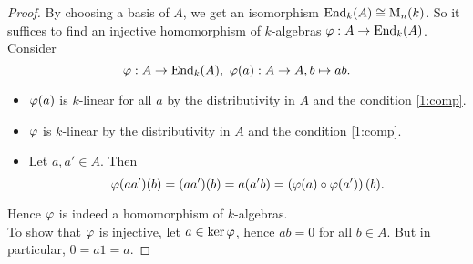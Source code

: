 \begin{proof}
	By choosing a basis of $A$, we get an isomorphism $\operatorname{End}_k(A)\cong \operatorname{M}_n(k)$. So it suffices to find an injective homomorphism of $k$-algebras $\varphi:A\to \operatorname{End}_k(A)$.\\
	Consider
	\[
	\varphi:A\to \operatorname{End}_k(A),~\varphi(a):A\to A,b\mapsto ab.
	\]
	\begin{itemize}
		\item $\varphi(a)$ is $k$-linear for all $a$ by the distributivity in $A$ and the condition \eqref{1:comp}.
		\item $\varphi$ is $k$-linear by the distributivity in $A$ and the condition \eqref{1:comp}.
		\item Let $a,a'\in A$. Then
		\[
		\varphi(aa')(b)=(aa')(b)=a(a'b)=\left(\varphi(a)\circ\varphi(a')\right)(b).
		\]
	\end{itemize}
	Hence $\varphi$ is indeed a homomorphism of $k$-algebras.\\
	To show that $\varphi$ is injective, let $a\in \ker \varphi$, hence $ab=0$ for all $b\in A$. But in particular, $0=a1=a$.
	\end{proof}
\lec
